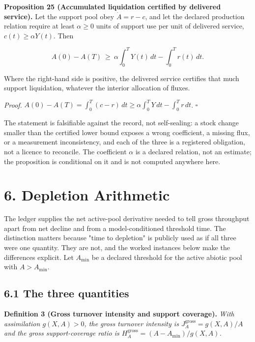 \documentclass[11pt]{article}
\begin{document}
\textbf{Proposition 25 (Accumulated liquidation certified by delivered service).} Let the support pool obey \(\dot A=r-c\), and let the declared production relation require at least \(\alpha\ge0\) units of support use per unit of delivered service, \(c(t)\ge\alpha Y(t)\). Then 

$$A(0)-A(T)\ \ge\ \alpha\int_0^TY(t)\,dt-\int_0^Tr(t)\,dt .$$

 Where the right-hand side is positive, the delivered service certifies that much support liquidation, whatever the interior allocation of fluxes.

\emph{Proof.} \(A(0)-A(T)=\allowbreak{}\int_0^T(c-r)\,\allowbreak{}dt\ge\alpha\int_0^TY\,\allowbreak{}dt-\int_0^Tr\,\allowbreak{}dt\). \(\square\)

The statement is falsifiable against the record, not self-sealing: a stock change smaller than the certified lower bound exposes a wrong coefficient, a missing flux, or a measurement inconsistency, and each of the three is a registered obligation, not a licence to reconcile. The coefficient \(\alpha\) is a declared relation, not an estimate; the proposition is conditional on it and is not computed anywhere here.

\vspace{0.8em}

\section*{6. Depletion Arithmetic}\label{6-depletion-arithmetic}

The ledger supplies the net active-pool derivative needed to tell gross throughput apart from net decline and from a model-conditioned threshold time. The distinction matters because "time to depletion" is publicly used as if all three were one quantity. They are not, and the worked instances below make the differences explicit. Let \(A_{\min}\) be a declared threshold for the active abiotic pool with \(A > A_{\min}\).

\subsection*{6.1 The three quantities}\label{61-the-three-quantities}

\textbf{Definition 3 (Gross turnover intensity and support coverage).} \emph{With assimilation \(g(X,A) > 0\), the gross turnover intensity is \(J_A^{\mathrm{gross}} =\allowbreak{} g(X,\allowbreak{}A)/A\) and the gross support-coverage ratio is \(H_A^{\mathrm{gross}} =\allowbreak{} (A - A_{\min})/g(X,\allowbreak{}A)\).}
\end{document}
